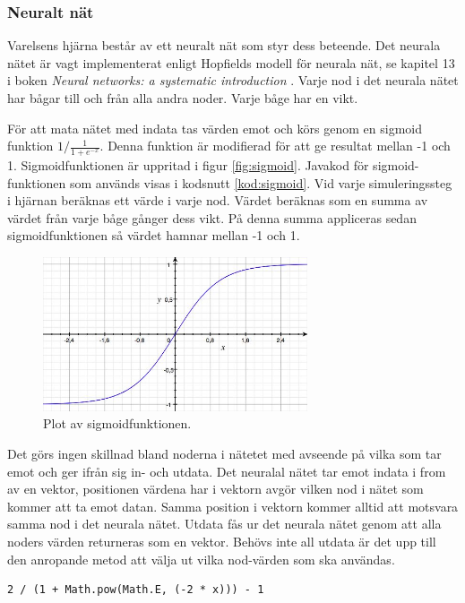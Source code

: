 \documentclass[titlepage, twocolumn, a4paper, 11pt, swedish]{article}
\begin{document}
\subsubsection{Neuralt nät}
Varelsens hjärna består av ett neuralt nät som styr dess beteende. Det neurala nätet är vagt implementerat enligt Hopfields modell för neurala nät, se kapitel 13 i boken \textit{Neural networks: a systematic introduction} \cite{raul}. Varje nod i det neurala nätet har bågar till och från alla andra noder. Varje båge har en vikt.

För att mata nätet med indata tas värden emot och körs genom en sigmoid funktion $1/\frac{1}{1 + e^{-x}}$. Denna funktion är modifierad för att ge resultat mellan -1 och 1. Sigmoidfunktionen är uppritad i figur \vref{fig:sigmoid}. Javakod för sigmoid-funktionen som används visas i kodsnutt \vref{kod:sigmoid}. Vid varje simuleringssteg i hjärnan beräknas ett värde i varje nod. Värdet beräknas som en summa av värdet från varje båge gånger dess vikt. På denna summa appliceras sedan sigmoidfunktionen så värdet hamnar mellan -1 och 1.

\begin{figure}
    \includegraphics[width=78mm]{images/sigmoid.jpg}
    \caption{Plot av sigmoidfunktionen.}
    \label{fig:sigmoid}
\end{figure}

Det görs ingen skillnad bland noderna i nätetet med avseende på vilka som tar emot och ger ifrån sig in- och utdata. Det neuralal nätet tar emot indata i from av en vektor, positionen värdena har i vektorn avgör vilken nod i nätet som kommer att ta emot datan. Samma position i vektorn kommer alltid att motsvara samma nod i det neurala nätet. Utdata fås ur det neurala nätet genom att alla noders värden returneras som en vektor. Behövs inte all utdata är det upp till den anropande metod att välja ut vilka nod-värden som ska användas.

\begin{kod}
\begin{footnotesize}
\begin{verbatim}
2 / (1 + Math.pow(Math.E, (-2 * x))) - 1
\end{verbatim}
\end{footnotesize}
\caption{Sigmoid (java)}\label{kod:sigmoid}
\end{kod}
\end{document}
